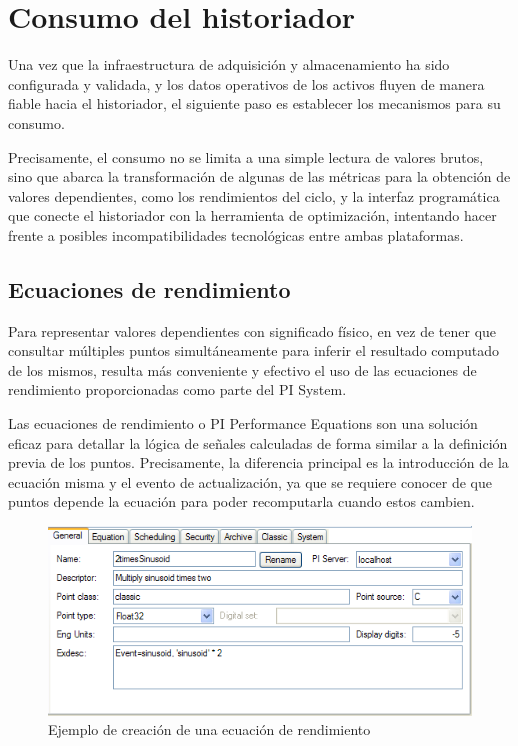\section{Consumo del historiador}
\label{makereference3.5}

Una vez que la infraestructura de adquisición y almacenamiento ha sido configurada y validada, y los datos operativos de los activos fluyen de manera fiable hacia el historiador, el siguiente paso es establecer los mecanismos para su consumo.

Precisamente, el consumo no se limita a una simple lectura de valores brutos, sino que abarca la transformación de algunas de las métricas para la obtención de valores dependientes, como los rendimientos del ciclo, y la interfaz programática  que conecte el historiador con la herramienta de optimización, intentando hacer frente a posibles incompatibilidades tecnológicas entre ambas plataformas.

\subsection{Ecuaciones de rendimiento}
\label{makereference3.5.1}

Para representar valores dependientes con significado físico, en vez de tener que consultar múltiples puntos simultáneamente para inferir el resultado computado de los mismos, resulta más conveniente y efectivo el uso de las ecuaciones de rendimiento proporcionadas como parte del PI System.

Las ecuaciones de rendimiento o PI Performance Equations son una solución eficaz para detallar la lógica de señales calculadas de forma similar a la definición previa de los puntos. Precisamente, la diferencia principal es la introducción de la ecuación misma y el evento de actualización, ya que se requiere conocer de que puntos depende la ecuación para poder recomputarla cuando estos cambien.

\begin{figure}
\centering
\includegraphics[width=0.5\linewidth]{figures/ecuaciones-de-rendimiento.png}
\caption{Ejemplo de creación de una ecuación de rendimiento}
\label{fig:ecuaciones-de-rendimiento}
\end{figure}

